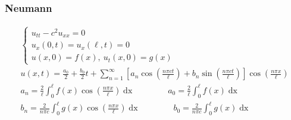 \subsubsection*{Neumann}
\begin{gather*}
\begin{cases}
u_{tt} - c^{2}u_{xx} = 0\\
u_{x}(0,t) = u_{x}(\ell,t) = 0\\
u(x,0) = f(x),\ u_{t}(x,0) = g(x)
\end{cases}\\
u(x,t) = \frac{a_{0}}{2} + \frac{b_{0}}{2}t +\sum_{n=1}^{\infty}\left[a_{n}\cos{\left(\frac{n\pi c
t}{\ell}\right)} + b_{n}\sin{\left(\frac{n\pi c t}{\ell}\right)}\right]\cos{\left(\frac{n\pi
x}{\ell}\right)}\\
a_{n} = \frac{2}{\ell}\int_{0}^{\ell}f(x)\cos{\left(\frac{n\pi x}{\ell}\right)}\mathop{dx}\qquad\qquad
a_{0} = \frac{2}{\ell}\int_{0}^{\ell}f(x)\mathop{dx}\\
b_{n} = \frac{2}{n\pi c}\int_{0}^{\ell}g(x)\cos{\left(\frac{n\pi x}{\ell}\right)}\mathop{dx}\qquad\qquad
b_{0} = \frac{2}{n\pi c}\int_{0}^{\ell}g(x)\mathop{dx}\\
\end{gather*}

